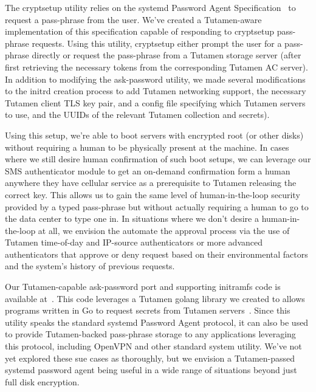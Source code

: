 The cryptsetup utility relies on the systemd Password Agent
Specification~\cite{systemd-passwordagents} to request a pass-phrase
from the user. We've created a Tutamen-aware implementation of this
specification capable of responding to cryptsetup pass-phrase
requests. Using this utility, cryptsetup either prompt the user for a
pass-phrase directly or request the pass-phrase from a Tutamen storage
server (after first retrieving the necessary tokens from the
corresponding Tutamen AC server). In addition to modifying the
ask-password utility, we made several modifications to the initrd
creation process to add Tutamen networking support, the necessary
Tutamen client TLS key pair, and a config file specifying which
Tutamen servers to use, and the UUIDs of the relevant Tutamen
collection and secrets).

Using this setup, we're able to boot servers with encrypted root (or
other disks) without requiring a human to be physically present at the
machine. In cases where we still desire human confirmation of such
boot setups, we can leverage our SMS authenticator module to get an
on-demand confirmation form a human anywhere they have cellular
service as a prerequisite to Tutamen releasing the correct key. This
allows us to gain the same level of human-in-the-loop security
provided by a typed pass-phrase but without actually requiring a human
to go to the data center to type one in. In situations where we don't
desire a human-in-the-loop at all, we envision the automate the
approval process via the use of Tutamen time-of-day and IP-source
authenticators or more advanced authenticators that approve or deny
request based on their environmental factors and the system's history
of previous requests.

Our Tutamen-capable ask-password port and supporting initramfs code is
available at~\cite{src-tutamen-askpassword}. This code leverages a
Tutamen golang library we created to allows programs written in Go to
request secrets from Tutamen servers~\cite{src-tutamen-go}. Since this
utility speaks the standard systemd Password Agent protocol, it can
also be used to provide Tutamen-backed pass-phrase storage to any
applications leveraging this protocol, including OpenVPN and other
standard system utility. We've not yet explored these sue cases as
thoroughly, but we envision a Tutamen-passed systemd password agent
being useful in a wide range of situations beyond just full disk
encryption.


